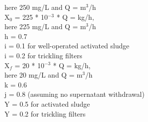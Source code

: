 \documentclass[a4paper, landscape]{article}
\begin{document}
\begin{multicols}{2}
\begin{multicols}{2}
here 250 mg/L and Q = m$^3$/h\\
X$_0$ = 225 * 10$^{-3}$ * Q = kg/h,\\
here 225 mg/L and Q = m$^3$/h\\
h = 0.7\\
i = 0.1 for well-operated activated sludge\\
i = 0.2 for trickling filters\\
X$_f$ = 20 * 10$^{-3}$ * Q = kg/h,\\
here 20 mg/L and Q = m$^3$/h\\
k = 0.6\\
j = 0.8 (assuming no supernatant withdrawal)\\
Y = 0.5 for activated sludge\\
Y = 0.2 for trickling filters
\vfill \null
\end{multicols}
\end{multicols}
\end{document}
